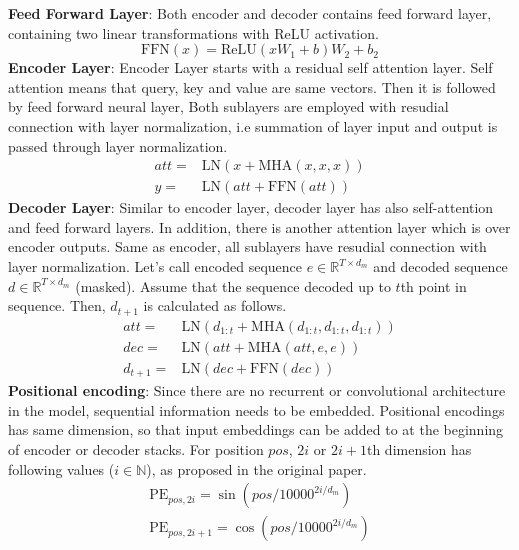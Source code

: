 \textbf{Feed Forward Layer}: Both encoder and decoder contains feed forward layer, containing two linear transformations with ReLU activation.
\begin{equation}
\mathrm{FFN}(x) = \text{ReLU}(xW_1+b)W_2+b_2
\end{equation}
\textbf{Encoder Layer}: Encoder Layer starts with a residual self attention layer. Self attention means that query, key and value are same vectors. Then it is followed by feed forward neural layer, Both sublayers are employed with resudial connection with layer normalization, i.e summation of layer input and output is passed through layer normalization. \\
\begin{equation}
\begin{split}
att = & \mathrm{LN}(x+ \mathrm{MHA}(x,x,x)) \\
y = & \mathrm{LN}(att+ \mathrm{FFN}(att))
\end{split}
\end{equation}
\textbf{Decoder Layer}: Similar to encoder layer, decoder layer has also self-attention and feed forward layers. In addition, there is another attention layer which is over encoder outputs. Same as encoder, all sublayers have resudial connection with layer normalization. Let's call encoded sequence $e \in \mathbb{R}^{T \times d_m}$ and decoded sequence $d \in \mathbb{R}^{T \times d_m}$ (masked). Assume that the sequence decoded up to $t$th point in sequence. Then, $d_{t+1}$ is calculated as follows. \\
\begin{equation}
\begin{split}
att = & \mathrm{LN}(d_{1:t}+\mathrm{MHA}(d_{1:t},d_{1:t},d_{1:t})) \\
dec = & \mathrm{LN}(att+ \mathrm{MHA}(att,e,e)) \\
d_{t+1} = & \mathrm{LN}(dec+ \mathrm{FFN}(dec))
\end{split}
\end{equation}
\textbf{Positional encoding}: Since there are no recurrent or convolutional architecture in the model, sequential information needs to be embedded. Positional encodings has same dimension, so that input embeddings can be added to at the beginning of encoder or decoder stacks. For position $pos$, $2i$ or $2i+1$th dimension has following values ($i \in \mathbb{N}$), as proposed in the original paper. \\
\begin{equation}
\begin{split}
\mathrm{PE}_{pos,2i} = \sin(pos/10000^{2i/d_m}) \\
\mathrm{PE}_{pos,2i+1} = \cos(pos/10000^{2i/d_m})
\end{split}
\end{equation}
